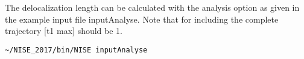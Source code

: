 The delocalization length \cite{Thouless.1974.PR.13.93} can be calculated with the analysis option as given in 
the example input file inputAnalyse. Note that for including the complete trajectory [t1 
max] should be 1. 
\begin{verbatim}
~/NISE_2017/bin/NISE inputAnalyse 
\end{verbatim}

